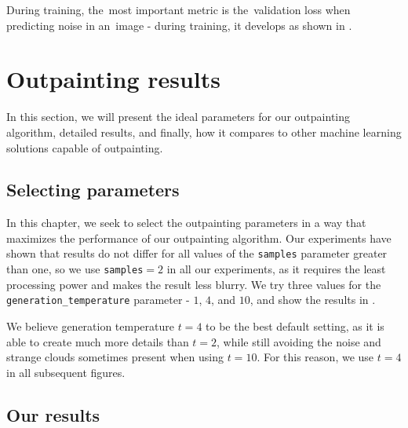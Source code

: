 During training, the~most important metric is the~validation loss when predicting noise in an~image - during training, it develops as shown in .




\section{Outpainting results}

In this section, we will present the ideal parameters for our outpainting algorithm, detailed results, and finally, how it compares to other machine learning solutions capable of outpainting.

\subsection{Selecting parameters}

In this chapter, we seek to select the outpainting parameters in a way that maximizes the performance of our outpainting algorithm. Our experiments have shown that results do not differ for all values of the \texttt{samples} parameter greater than one, so we use \texttt{samples}$=2$ in all our experiments, as it requires the least processing power and makes the result less blurry. We try three values for the \texttt{generation_temperature} parameter - $1$, $4$, and $10$, and show the results in .


We believe generation temperature $t=4$ to be the best default setting, as it is able to create much more details than $t=2$, while still avoiding the noise and strange clouds sometimes present when using $t=10$. For this reason, we use $t=4$ in all subsequent figures.


\subsection{Our results}

